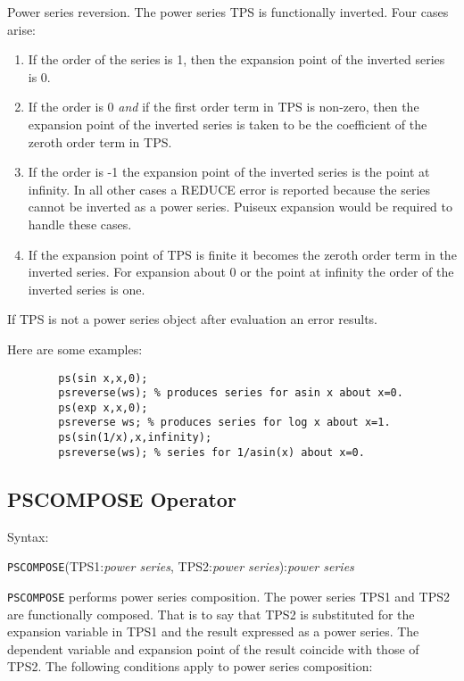 Power series reversion.  The power series TPS is functionally
inverted.  Four cases arise:

\begin{enumerate}
\item If the order of the series is 1, then the expansion point of the
inverted series is 0. 

\item If the order is 0 {\em and} if the first order term in TPS
is non-zero, then the expansion point of the inverted series is taken
to be the coefficient of the zeroth order term in TPS.

\item If the order is -1 the expansion point of the inverted series
is the point at infinity.  In all other cases a REDUCE error is
reported because the series cannot be inverted as a power series.
Puiseux  expansion would be required to
handle these cases. 

\item If the expansion point of TPS is finite it becomes the
zeroth order term in the inverted series. For expansion about 0 or the
point at infinity the order of the inverted series is one.
\end{enumerate}

If TPS is not a power series object after evaluation an error results.

\noindent Here are some examples:
\begin{verbatim}
        ps(sin x,x,0);
        psreverse(ws); % produces series for asin x about x=0.
        ps(exp x,x,0);
        psreverse ws; % produces series for log x about x=1.
        ps(sin(1/x),x,infinity);
        psreverse(ws); % series for 1/asin(x) about x=0.
\end{verbatim}

\subsection{PSCOMPOSE Operator}

Syntax:

\hspace*{2em} {\tt PSCOMPOSE}(TPS1:{\em power series},
TPS2:{\em power series}):{\em power series}

{\tt PSCOMPOSE} performs power series composition.
The power series TPS1 and TPS2 are functionally composed.
That is to say that TPS2 is substituted for the expansion
variable in TPS1 and the result expressed as a power series. The
dependent variable and expansion point of the result coincide with
those of TPS2.  The following conditions apply to power series
composition:

